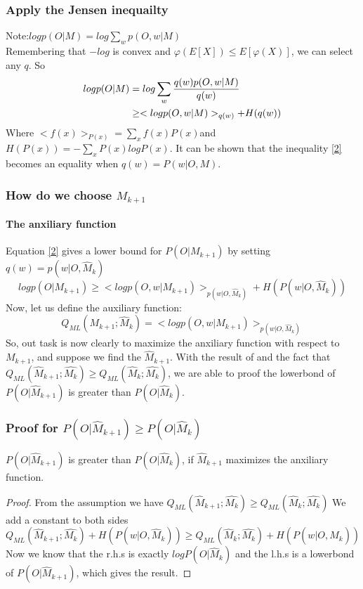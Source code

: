 \documentclass{beamer}
\begin{document}
\begin{frame}
\frametitle{Apply the Jensen inequailty}
Note:$logp(O|M)=log\sum_wp(O,w|M)$\\
Remembering that $-log$ is convex and $\varphi(E[X]) \leq E[\varphi(X)]$, we can select any $q$. So
\begin{equation}{\label{2}}
\begin{split}
	logp(O|M) &= log \sum_{w}\frac{q(w) p(O,w|M)}{q(w)} \\
				& \geq <logp(O,w|M)>_{q(w)} + H(q(w)) 
\end{split}
\end{equation}
Where $	<f(x)>_{P(x)} = \sum_x f(x)P(x)$and$H(P(x)) = - \sum_x{P(x)logP(x)}$.
It can be shown \cite{Dempster} that the inequality \ref{2} \alert{becomes an equality} when $q(w) = P(w|O,M)$.
\end{frame}

\begin{frame}
\frametitle{How do we choose $M_{k+1}$}
\framesubtitle{The anxiliary function}
Equation \ref{2} gives a lower bound for $P(O|M_{k+1})$ by setting $q(w) = p(w|O,\hat{M}_k)$
\begin{equation}
logp(O|M_{k+1}) \geq <logp(O,w|M_{k+1})>_{p(w|O,\hat{M}_k)} + H(P(w|O,\hat{M}_k))
\end{equation}
Now, let us define the auxiliary function:
\begin{equation}
Q_{ML}(M_{k+1};\hat{M}_k) = <logp(O,w|M_{k+1})>_{p(w|O,\hat{M}_k)}
\end{equation}
So, out task is now clearly to maximize the anxiliary function with respect to $M_{k+1}$, and suppose we find the $\hat{M}_{k+1}$. With the result of \cite{Dempster} and the fact that $Q_{ML}(\hat{M}_{k+1};\hat{M_k}) \geq Q_{ML}(\hat{M}_k;\hat{M_k})$, we are able to proof \alert{the lowerbond of $P(O|\hat{M}_{k+1})$ is greater than $P(O|\hat{M}_{k})$}.
\end{frame}

\begin{frame}
\frametitle{Proof for $P(O|\hat{M}_{k+1}) \geq P(O|\hat{M}_{k})$}

\begin{theorem}
$P(O|\hat{M}_{k+1})$ is greater than $P(O|\hat{M}_{k})$, if $\hat{M}_{k+1}$ maximizes the anxiliary function.
\end{theorem}

\begin{proof}
From the assumption we have 
$Q_{ML}(\hat{M}_{k+1};\hat{M_k}) \geq Q_{ML}(\hat{M}_k;\hat{M_k})$
We add a constant to both sides
$Q_{ML}(\hat{M}_{k+1};\hat{M_k}) + H(P(w|O,\hat{M}_k)) \geq Q_{ML}(\hat{M}_k;\hat{M_k}) + H(P(w|O,\hat{M}_k))$ \\
Now we know that the r.h.s is exactly $logP(O|\hat{M}_{k})$ and the l.h.s is a lowerbond of $P(O|\hat{M}_{k+1})$, which gives the result.
\end{proof}
\end{frame}
\end{document}
